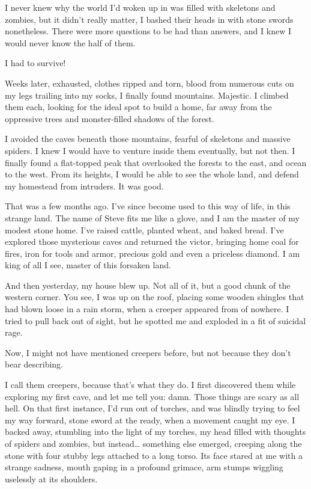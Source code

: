 \documentclass[]{book}
\begin{document}
I never knew why the world I'd woken up in was filled with skeletons and
zombies, but it didn't really matter, I bashed their heads in with stone
swords nonetheless. There were more questions to be had than answers,
and I knew I would never know the half of them.

I had to survive!

Weeks later, exhausted, clothes ripped and torn, blood from numerous
cuts on my legs trailing into my socks, I finally found mountains.
Majestic. I climbed them each, looking for the ideal spot to build a
home, far away from the oppressive trees and monster-filled shadows of
the forest.

I avoided the caves beneath those mountains, fearful of skeletons and
massive spiders. I knew I would have to venture inside them eventually,
but not then. I finally found a flat-topped peak that overlooked the
forests to the east, and ocean to the west. From its heights, I would be
able to see the whole land, and defend my homestead from intruders. It
was good.

That was a few months ago. I've since become used to this way of life,
in this strange land. The name of Steve fits me like a glove, and I am
the master of my modest stone home. I've raised cattle, planted wheat,
and baked bread. I've explored those mysterious caves and returned the
victor, bringing home coal for fires, iron for tools and armor, precious
gold and even a priceless diamond. I am king of all I see, master of
this forsaken land.

And then yesterday, my house blew up. Not all of it, but a good chunk of
the western corner. You see, I was up on the roof, placing some wooden
shingles that had blown loose in a rain storm, when a creeper appeared
from of nowhere. I tried to pull back out of sight, but he spotted me
and exploded in a fit of suicidal rage.

Now, I might not have mentioned creepers before, but not because they
don't bear describing.

I call them creepers, because that's what they do. I first discovered
them while exploring my first cave, and let me tell you: damn. Those
things are scary as all hell. On that first instance, I'd run out of
torches, and was blindly trying to feel my way forward, stone sword at
the ready, when a movement caught my eye. I backed away, stumbling into
the light of my torches, my head filled with thoughts of spiders and
zombies, but instead\ldots{} something else emerged, creeping along the
stone with four stubby legs attached to a long torso. Its face stared at
me with a strange sadness, mouth gaping in a profound grimace, arm
stumps wiggling uselessly at its shoulders.
\end{document}
